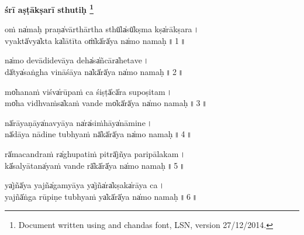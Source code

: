 \documentclass[parskip, DIV=18]{scrartcl}
\renewcommand{\thefootnote}{\fnsymbol{footnote}} %
\begin{document}

\vspace{-1.5cm}

\begin{center}
\textbf{{\Huge śrī a॒ṣṭākṣarī sthutiḥ॒} \LARGE\let\thefootnote\relax\footnote{ \color{gray} Document written using \XeLaTeX{} and chandas font, LSN, version 27/12/2014.}}
\end{center}
\Large

\centering

\vspace{0.5cm}

oṁ na̍maḥ praṇa̍vārthā॒rtha sthū̍la̍sū̍kṣma kṣa̍rākṣa॒ra॒\,। \\
vya॒ktā̍vya̍kta ka̍lātī॒ta oṁ̍kā̍rā̍ya na̍mo na॒ma॒ḥ॒\,॥\,1\,॥ \par 


\noindent na̍mo devādi॑devā॒ya de॑ha̍sa̍ñcāra̍heta॒ve॒\,। \\
dā̍tya̍saṅgha vi॑nāśā॒ya na̍kā̍rā̍ya na̍mo na॒ma॒ḥ॒\,॥\,2\,॥ \par


\noindent mo̍hanaṁ viśva̍rūpa॒ṁ ca śi॒ṣṭā̍cā̍ra su॑poṣi॒ta॒m\,। \\
mo̍ha vidhvaṁsa̍kaṁ va॒nde mo̍kā̍rā̍ya na̍mo na॒ma॒ḥ॒\,॥\,3\,॥ \par


\noindent nā̍rāyaṇāya̍navyā॒ya na̍ra̍si॑ṁhāya̍nāmi॒ne॒\,। \\
nā̍dāya nādi॑ne tu॒bhyaṁ nā̍kā̍rā̍ya na̍mo na॒ma॒ḥ॒\,॥\,4\,॥ \par


\noindent rā̍macandraṁ ra̍ghupa॒tiṁ pi॒trā̍jñya pari॑pāla॒ka॒m\,। \\
kā̍salyātana̍yaṁ va॒nde rā̍kā̍rā̍ya na̍mo na॒ma॒ḥ॒\,॥\,5\,॥ \par


\noindent ya̍jñā̍ya yajña̍gamyā॒ya ya̍jña̍ra̍kṣaka̍rāya॒ ca॒\,। \\
ya॒jñā̍ṅga rūpi॑ṇe tu॒bhyaṁ ya̍kā̍rā̍ya na̍mo na॒ma॒ḥ॒\,॥\,6\,॥ \par
\end{document}
